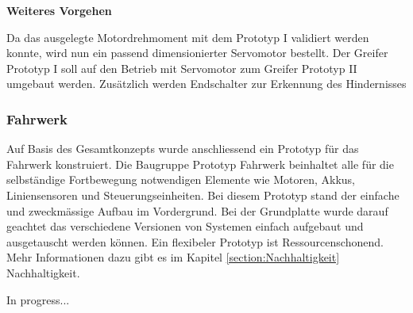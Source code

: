 \textbf{Weiteres Vorgehen}

Da das ausgelegte Motordrehmoment mit dem Prototyp I validiert werden konnte, wird nun ein passend dimensionierter Servomotor bestellt. Der Greifer Prototyp I soll auf den Betrieb mit Servomotor zum Greifer Prototyp II umgebaut werden. Zusätzlich werden Endschalter zur Erkennung des Hindernisses


\subsubsection{Fahrwerk}

Auf Basis des Gesamtkonzepts wurde anschliessend ein Prototyp für das Fahrwerk konstruiert. Die Baugruppe Prototyp Fahrwerk beinhaltet alle für die selbständige Fortbewegung notwendigen Elemente wie Motoren, Akkus, Liniensensoren und Steuerungseinheiten.  Bei diesem Prototyp stand der einfache und zweckmässige Aufbau im Vordergrund. Bei der Grundplatte wurde darauf geachtet das verschiedene  Versionen von Systemen einfach aufgebaut und ausgetauscht werden können. Ein flexibeler Prototyp ist Ressourcenschonend. Mehr Informationen dazu gibt es im Kapitel \ref{section:Nachhaltigkeit} Nachhaltigkeit. 

In progress...
